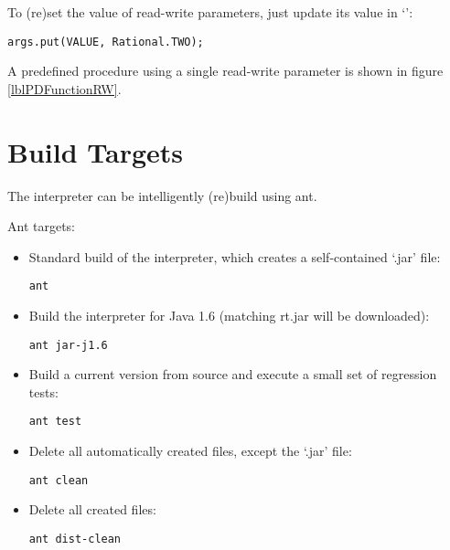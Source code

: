 To (re)set the value of read-write parameters, just update its value in `':
\begin{lstlisting}[frame=none,numbers=none]
args.put(VALUE, Rational.TWO);
\end{lstlisting}

A predefined procedure using a single read-write parameter is shown in figure \ref{lblPDFunctionRW}.


\section{Build Targets}

The interpreter can be intelligently (re)build using ant.

Ant targets:

\begin{itemize}
    \item Standard build of the interpreter, which creates a self-contained `.jar' file:
\begin{lstlisting}[frame=none,numbers=none]
ant
\end{lstlisting}

    \item Build the interpreter for Java 1.6 (matching rt.jar will be downloaded):

\begin{lstlisting}[frame=none,numbers=none]
ant jar-j1.6
\end{lstlisting}

    \item Build a current version from source and execute a small set of regression tests:

\begin{lstlisting}[frame=none,numbers=none]
ant test
\end{lstlisting}

    \item Delete all automatically created files, except the `.jar' file:

\begin{lstlisting}[frame=none,numbers=none]
ant clean
\end{lstlisting}

    \item Delete all created files:

\begin{lstlisting}[frame=none,numbers=none]
ant dist-clean
\end{lstlisting}

\end{itemize}

